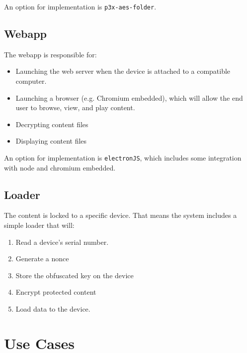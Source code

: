 \documentclass{article}
\begin{document}
An option for implementation is \verb+p3x-aes-folder+.

\subsection{Webapp}

The webapp is responsible for:
\begin{itemize}
\item Launching the web server when the device is attached to 
      a compatible computer.
\item Launching a browser (e.g. Chromium embedded), which will allow
      the end user to browse, view, and play content.
\item Decrypting content files
\item Displaying content files 
\end{itemize}

An option for implementation is \verb+electronJS+, which includes some 
integration with node and chromium embedded.

\subsection{Loader}

The content is locked to a specific device.  That means the system includes
a simple loader that will:
\begin{enumerate}
\item Read a device's serial number.
\item Generate a nonce
\item Store the obfuscated key on the device
\item Encrypt protected content
\item Load data to the device.
\end{enumerate}

\section{Use Cases}
\end{document}

